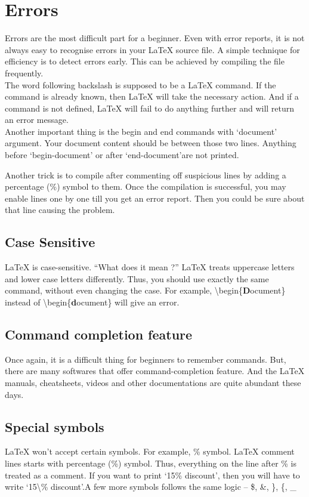 \documentclass{article}
\begin{document}
\section{Errors}
Errors are the most difficult part for a beginner. Even with error reports, it is not always easy to recognise errors in your \LaTeX{} source file. A simple technique for efficiency is to detect errors early. This can be achieved by compiling the file frequently.\\

The word following backslash is supposed to be a LaTeX command. If the command is already known, then LaTeX will take the necessary action. And if a command is not defined, \LaTeX{} will fail to do anything further and will return an error message.\\

Another important thing is the begin and end commands with `document' argument. Your document content should be between those two lines. Anything before `begin-document' or after `end-document'are not printed.

Another trick is to compile after commenting off suspicious lines by adding a percentage (\%) symbol to them. Once the compilation is successful, you may enable lines one by one till you get an error report. Then you could be sure about that line causing the problem.

\subsection*{Case Sensitive}
\LaTeX{} is case-sensitive. ``What does it mean ?'' \LaTeX{} treats uppercase letters and lower case letters differently. Thus, you should use exactly the same command, without even changing the case. For example, \textbackslash begin\{\textbf{D}ocument\} instead of \textbackslash begin\{\textbf{d}ocument\} will give an error.

\subsection*{Command completion feature}
Once again, it is a difficult thing for beginners to remember commands. But, there are many softwares that offer command-completion feature. And the \LaTeX{} manuals, cheatsheets, videos and other documentations are quite abundant these days.

\subsection*{Special symbols}
LaTeX won't accept certain symbols. For example, \% symbol. \LaTeX{} comment lines starts with percentage (\%) symbol. Thus, everything on the line after \% is treated as a comment. If you want to print `15\% discount', then you will have to write `15\textbackslash\% discount'.A few more symbols follows the same logic -- \$, \&, \}, \{, \_
\end{document}
